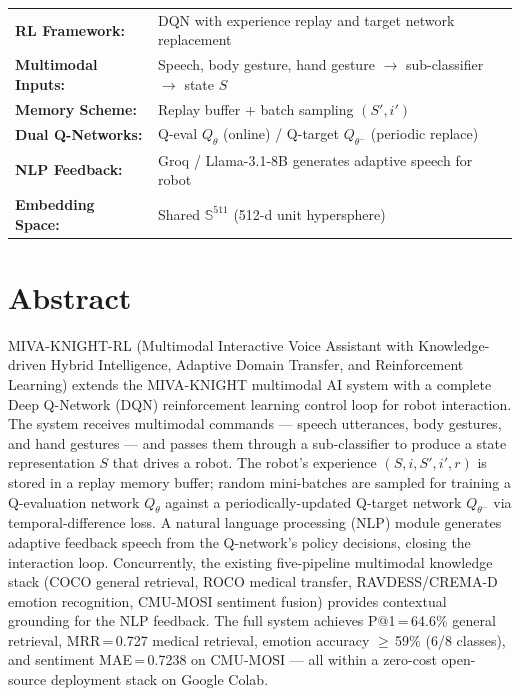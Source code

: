 \documentclass[12pt,a4paper]{article}
\theoremstyle{definition}
\theoremstyle{plain}
\theoremstyle{remark}
\newcommand{\Sph}{\mathbb{S}}
\newcommand{\Qeval}{Q_\theta}
\newcommand{\Qtgt}{Q_{\theta^-}}
\begin{document}
\begin{titlepage}
\vfill
\begin{center}
\begin{tabular}{ll}
\textbf{RL Framework:} & DQN with experience replay and target network replacement \\
\textbf{Multimodal Inputs:} & Speech, body gesture, hand gesture $\to$ sub-classifier $\to$ state $S$ \\
\textbf{Memory Scheme:} & Replay buffer + batch sampling $(S',i')$ \\
\textbf{Dual Q-Networks:} & Q-eval $\Qeval$ (online) / Q-target $\Qtgt$ (periodic replace) \\
\textbf{NLP Feedback:} & Groq / Llama-3.1-8B generates adaptive speech for robot \\
\textbf{Embedding Space:} & Shared $\Sph^{511}$ (512-d unit hypersphere) \\
\end{tabular}
\end{center}
\vspace{1.5cm}
\end{titlepage}

\tableofcontents
\newpage

\section{Abstract}

MIVA-KNIGHT-RL (Multimodal Interactive Voice Assistant with Knowledge-driven Hybrid Intelligence, Adaptive Domain Transfer, and Reinforcement Learning) extends the MIVA-KNIGHT multimodal AI system with a complete Deep Q-Network (DQN) reinforcement learning control loop for robot interaction. The system receives multimodal commands — speech utterances, body gestures, and hand gestures — and passes them through a sub-classifier to produce a state representation $S$ that drives a robot. The robot's experience $(S, i, S', i', r)$ is stored in a replay memory buffer; random mini-batches are sampled for training a Q-evaluation network $\Qeval$ against a periodically-updated Q-target network $\Qtgt$ via temporal-difference loss. A natural language processing (NLP) module generates adaptive feedback speech from the Q-network's policy decisions, closing the interaction loop. Concurrently, the existing five-pipeline multimodal knowledge stack (COCO general retrieval, ROCO medical transfer, RAVDESS/CREMA-D emotion recognition, CMU-MOSI sentiment fusion) provides contextual grounding for the NLP feedback. The full system achieves P@1\,=\,64.6\% general retrieval, MRR\,=\,0.727 medical retrieval, emotion accuracy $\geq$\,59\% (6/8 classes), and sentiment MAE\,=\,0.7238 on CMU-MOSI — all within a zero-cost open-source deployment stack on Google Colab.
\end{document}
